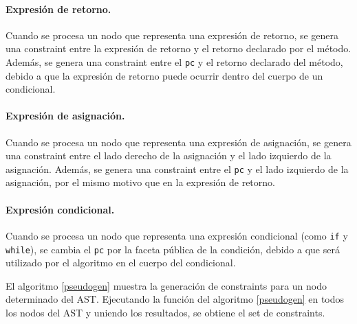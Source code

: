 \paragraph{Expresión de retorno.}Cuando se procesa un nodo que representa una expresión de retorno, se genera una constraint entre la expresión de retorno y el retorno declarado por el método. Además, se genera una constraint entre el \texttt{pc} y el retorno declarado del método, debido a que la expresión de retorno puede ocurrir dentro del cuerpo de un condicional.

\paragraph{Expresión de asignación.}Cuando se procesa un nodo que representa una expresión de asignación, se genera una constraint entre el lado derecho de la asignación y el lado izquierdo de la asignación. Además, se genera una constraint entre el \texttt{pc} y el lado izquierdo de la asignación, por el mismo motivo que en la expresión de retorno.

\paragraph{Expresión condicional.}Cuando se procesa un nodo que representa una expresión condicional (como \texttt{if} y \texttt{while}), se cambia el \texttt{pc} por la faceta pública de la condición, debido a que será utilizado por el algoritmo en el cuerpo del condicional.

El algoritmo \ref{pseudogen} muestra la generación de constraints para un nodo determinado del AST. Ejecutando la función del algoritmo \ref{pseudogen} en todos los nodos del AST y uniendo los resultados, se obtiene el set de constraints.
\clearpage

